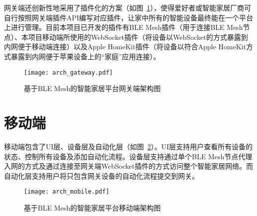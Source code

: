 网关端还创新性地采用了插件化的方案（如图~\ref{fig:arch_gateway}），使得爱好者或智能家居厂商可自行按照网关端插件API编写对应插件，让家中所有的智能设备最终能在一个平台上进行管理。目前本项目已开发的插件有BLE Mesh插件（用于连接BLE Mesh节点）、本项目移动端所使用的WebSocket插件（将设备以WebSocket的方式暴露到内网便于移动端连接）以及Apple HomeKit插件（将设备以符合Apple HomeKit方式暴露到内网便于苹果设备上的“家庭”应用连接）。
\begin{figure}[H]
    \centering
    \texttt{[image: arch\_gateway.pdf]}
    \caption{基于BLE Mesh的智能家居平台网关端架构图}
    \label{fig:arch_gateway}
\end{figure}

\section{移动端}
\label{design:mobile}
移动端包含了UI层、设备层及自动化层（如图~\ref{fig:arch_mobile}）。UI层支持用户查看所有设备的状态、控制所有设备及添加自动化流程。设备层支持通过单个BLE Mesh节点代理入网的方式及通过连接至网关端WebSocket插件的方式访问整个智能家居网络。而自动化层支持用户将只包含网关设备的自动化流程提交到网关。
\begin{figure}[H]
    \centering
    \texttt{[image: arch\_mobile.pdf]}
    \caption{基于BLE Mesh的智能家居平台移动端架构图}
    \label{fig:arch_mobile}
\end{figure}
